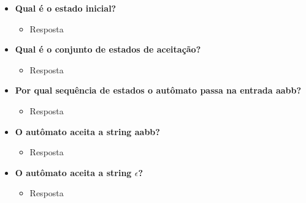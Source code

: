 \documentclass[a4paper, 12pt]{article}
\begin{document}
\begin{itemize}
    \item \textbf{Qual é o estado inicial?}
    \begin{itemize}
        \item Resposta
    \end{itemize}
    
    
    \item \textbf{Qual é o conjunto de estados de aceitação?}
    \begin{itemize}
        \item Resposta
    \end{itemize}
    
    
    \item \textbf{Por qual sequência de estados o autômato passa na entrada aabb?}
    \begin{itemize}
        \item Resposta
    \end{itemize}
    
    
    \item \textbf{O autômato aceita a string aabb?}
    \begin{itemize}
        \item Resposta
    \end{itemize}
    
    
    \item \textbf{O autômato aceita a string $\epsilon$?}
    \begin{itemize}
        \item Resposta
    \end{itemize}
\end{itemize}
\end{document}
